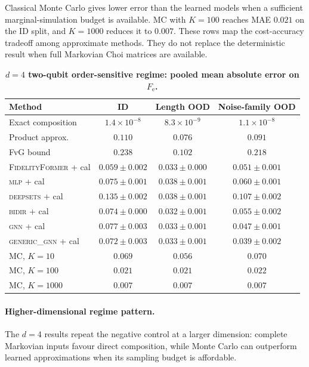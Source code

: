 \documentclass[12pt]{iopart}
\providecommand{\bm}[1]{\boldsymbol{#1}}
\newcommand{\Fe}{F_{\mathrm{e}}}
\newcommand{\fidno}{\textsc{FidelityFormer}}
\begin{document}
Classical Monte Carlo gives lower error than the learned models when a sufficient marginal-simulation budget is available. MC with $K=100$ reaches MAE $0.021$ on the ID split, and $K=1000$ reduces it to $0.007$. These rows map the cost-accuracy tradeoff among approximate methods. They do not replace the deterministic result when full Markovian Choi matrices are available.

\begin{table}[h]
\centering
\caption{\textbf{$d{=}4$ two-qubit order-sensitive regime: pooled mean absolute error on $\Fe$.}}
\label{tab:d4}
\begin{tabular}{lccc}
\toprule
Method & ID & Length OOD & Noise-family OOD \\
\midrule
Exact composition  & $1.4\!\times\!10^{-8}$ & $8.3\!\times\!10^{-9}$ & $1.1\!\times\!10^{-8}$ \\
\midrule
Product approx.    & $0.110$ & $0.076$ & $0.091$ \\
FvG bound          & $0.238$ & $0.102$ & $0.218$ \\
\midrule
\fidno{} + cal     & $\bm{0.059 \pm 0.002}$ & $0.033 \pm 0.000$ & $0.051 \pm 0.001$ \\
\textsc{mlp} + cal & $0.075 \pm 0.001$ & $0.038 \pm 0.001$ & $0.060 \pm 0.001$ \\
\textsc{deepsets} + cal & $0.135 \pm 0.002$ & $0.038 \pm 0.001$ & $0.107 \pm 0.002$ \\
\textsc{bidir} + cal & $0.074 \pm 0.000$ & $\bm{0.032 \pm 0.001}$ & $0.055 \pm 0.002$ \\
\textsc{gnn} + cal & $0.077 \pm 0.003$ & $0.033 \pm 0.001$ & $0.047 \pm 0.001$ \\
\textsc{generic\_gnn} + cal & $0.072 \pm 0.003$ & $0.033 \pm 0.001$ & $\bm{0.039 \pm 0.002}$ \\
\midrule
MC, $K{=}10$       & $0.069$ & $0.056$ & $0.070$ \\
MC, $K{=}100$      & $0.021$ & $0.021$ & $0.022$ \\
MC, $K{=}1000$     & $0.007$ & $0.007$ & $0.007$ \\
\bottomrule
\end{tabular}
\end{table}

\paragraph*{Higher-dimensional regime pattern.}
The $d=4$ results repeat the negative control at a larger dimension: complete Markovian inputs favour direct composition, while Monte Carlo can outperform learned approximations when its sampling budget is affordable.
\end{document}
